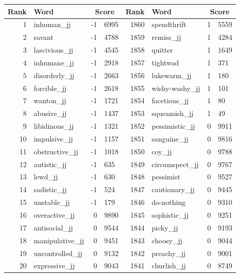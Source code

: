 \begin{table}[tbp]
    \begin{tabular}{| rlr@{.}l | rlr@{.}l |}
    \hline
    \textbf{Rank} & \textbf{Word} & \multicolumn{2}{c|}{\textbf{Score}} & \textbf{Rank} & \textbf{Word} & \multicolumn{2}{c|}{\textbf{Score}} \\
    \hline
    1 & inhuman\_jj & -1 & 6995    &    1860 & spendthrift & 1 & 5559 \\
    2 & savant & -1 & 4788    &    1859 & remiss\_jj & 1 & 4284 \\
    3 & lascivious\_jj & -1 & 4545    &    1858 & quitter & 1 & 1649 \\
    4 & inhumane\_jj & -1 & 2918    &    1857 & tightwad & 1 & 371 \\
    5 & disorderly\_jj & -1 & 2663    &    1856 & lukewarm\_jj & 1 & 180 \\
    6 & forcible\_jj & -1 & 2618    &    1855 & wishy-washy\_jj & 1 & 101 \\
    7 & wanton\_jj & -1 & 1721    &    1854 & facetious\_jj & 1 & 80 \\
    8 & abusive\_jj & -1 & 1437    &    1853 & squeamish\_jj & 1 & 49 \\
    9 & libidinous\_jj & -1 & 1321    &    1852 & pessimistic\_jj & 0 & 9911 \\
    10 & impulsive\_jj & -1 & 1157    &    1851 & sanguine\_jj & 0 & 9816 \\
    11 & obstructive\_jj & -1 & 1018    &    1850 & coy\_jj & 0 & 9788 \\
    12 & autistic\_jj & -1 & 635    &    1849 & circumspect\_jj & 0 & 9767 \\
    13 & lewd\_jj & -1 & 630    &    1848 & pessimist & 0 & 9527 \\
    14 & sadistic\_jj & -1 & 524    &    1847 & cautionary\_jj & 0 & 9445 \\
    15 & unstable\_jj & -1 & 179    &    1846 & do-nothing & 0 & 9310 \\
    16 & overactive\_jj & 0 & 9890    &    1845 & sophistic\_jj & 0 & 9251 \\
    17 & antisocial\_jj & 0 & 9544    &    1844 & picky\_jj & 0 & 9193 \\
    18 & manipulative\_jj & 0 & 9451    &    1843 & choosy\_jj & 0 & 9044 \\
    19 & uncontrolled\_jj & 0 & 9132    &    1842 & preachy\_jj & 0 & 9001 \\
    20 & expressive\_jj & 0 & 9043    &    1841 & churlish\_jj & 0 & 8749 \\

\end{tabular}
\end{table}
